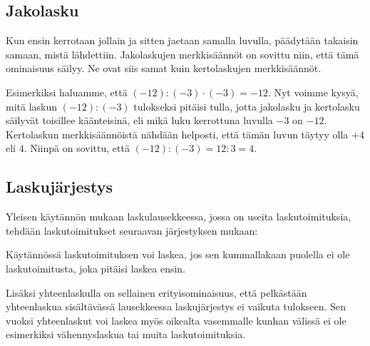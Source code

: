 \subsection*{Jakolasku}

Kun ensin kerrotaan jollain ja sitten jaetaan samalla luvulla, päädytään takaisin samaan,
mistä lähdettiin.  Jakolaskujen merkkisäännöt on sovittu niin, että tämä ominaisuus säilyy.
Ne ovat siis samat kuin kertolaskujen merkkisäännöt.

Esimerkiksi haluamme, että $(-12):(-3)\cdot (-3)=-12$. Nyt voimme kysyä, mitä laskun
$(-12):(-3)$ tulokseksi pitäisi tulla, jotta jakolasku ja kertolasku säilyvät toisillee
käänteisinä, eli mikä luku kerrottuna luvulla $-3$ on $-12$. Kertolaskun merkkisäännöistä
nähdään helposti, että tämän luvun täytyy olla $+4$ eli $4$. Niinpä on
sovittu, että $(-12):(-3)=12:3=4$.


\subsection*{Laskujärjestys}

Yleisen käytännön mukaan laskulausekkeessa, jossa on useita laskutoimituksia, tehdään laskutoimitukset seuraavan järjestyksen mukaan:


Käytännössä laskutoimituksen voi laskea, jos sen kummallakaan puolella ei ole laskutoimitusta, joka pitäisi laskea ensin.

Lisäksi yhteenlaskulla on sellainen erityisominaisuus, että pelkästään yhteenlaskua sisältävässä
lausekkeessa laskujärjestys ei vaikuta tulokseen. Sen vuoksi yhteenlaskut voi laskea myös oikealta
vasemmalle kunhan välissä ei ole esimerkiksi vähennyslaskua tai muita laskutoimituksia.

